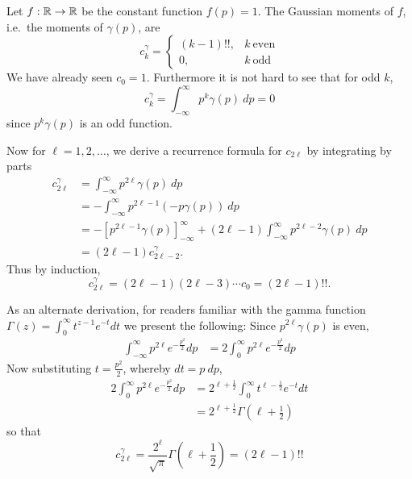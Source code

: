 \begin{myexample}
  Let $f: \mathbb{R} \rightarrow \mathbb{R}$ be the constant function $f(p)=1$. The Gaussian moments of $f$, i.e.\ the moments of $\gamma(p)$, are
  \[
    c^\gamma_k 
    = \begin{cases}
        (k-1)!!, & k~\text{even} \\
        0, & k~\text{odd}
    \end{cases}
  \]
  We have already seen $c_0 = 1$. Furthermore it is not hard to see that for odd $k$, 
  \[
    c^\gamma_k = \int_{-\infty}^\infty p^k \gamma(p) ~dp = 0
  \]
  since $p^k \gamma(p)$ is an odd function.

  Now for $\ell = 1, 2, \ldots$, we derive a recurrence formula for $c_{2\ell}$ by integrating by parts
  \begin{align*}
    c^\gamma_{2\ell}
    &= \int_{-\infty}^\infty p^{2\ell} \gamma(p) ~dp \\
    &= -\int_{-\infty}^\infty p^{2\ell-1} \left(-p \gamma(p)\right) ~dp \\
    &= - \left[p^{2\ell-1} \gamma(p)\right]_{-\infty}^\infty + (2\ell-1)\int_{-\infty}^\infty p^{2\ell-2} \gamma(p) ~dp \\
    &= (2\ell-1)c^\gamma_{2\ell-2}.
  \end{align*}
  Thus by induction,
  \[
    c^\gamma_{2\ell} = (2\ell - 1)(2\ell - 3) \cdots c_0 = (2\ell-1)!!.
  \]

  As an alternate derivation, for readers familiar with the gamma function $\Gamma(z) = \int_0^\infty t^{z-1}e^{-t} dt$ we present the following: Since $p^{2\ell} \gamma(p)$ is even,
  \begin{align*}
    \int_{-\infty}^\infty p^{2\ell} e^{-\frac{p^2}2} dp 
      &= 2\int_0^\infty p^{2\ell} e^{-\frac{p^2}2} dp 
  \end{align*}
  Now substituting $t = \frac{p^2}2$, whereby $dt = p~dp$,
  \begin{align*}
    2\int_0^\infty p^{2\ell} e^{-\frac{p^2}2} dp 
      &= 2^{\ell+\frac12}\int_0^\infty t^{\ell - \frac12}e^{-t} dt \\
      &= 2^{\ell+\frac12} \Gamma\left(\ell + \frac12\right)
  \end{align*}
  so that
  \[
    c^\gamma_{2\ell} = \frac{2^{\ell}}{\sqrt{\pi}} \Gamma\left(\ell + \frac12\right) = (2\ell - 1)!!
  \]
\end{myexample}



